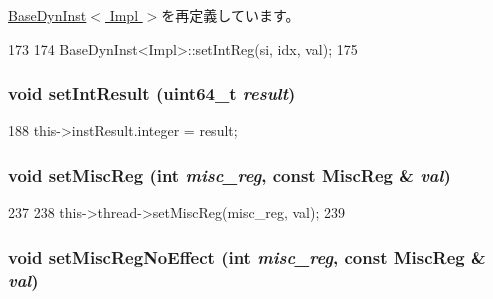 \hyperlink{classBaseDynInst_a654e99f2be7cd298378462ce9651bb44}{BaseDynInst$<$ Impl $>$}を再定義しています。


\begin{DoxyCode}
173     {
174         BaseDynInst<Impl>::setIntReg(si, idx, val);
175     }
\end{DoxyCode}
\hypertarget{classOzoneDynInst_aae8906a08187794ab88e5e140bb4c1e9}{
\subsubsection[{setIntResult}]{\setlength{\rightskip}{0pt plus 5cm}void setIntResult (uint64\_\-t {\em result})}}
\label{classOzoneDynInst_aae8906a08187794ab88e5e140bb4c1e9}



\begin{DoxyCode}
188 { this->instResult.integer = result; }
\end{DoxyCode}
\hypertarget{classOzoneDynInst_a1877dde4f3eb17a8b7d33ea40176c148}{
\subsubsection[{setMiscReg}]{\setlength{\rightskip}{0pt plus 5cm}void setMiscReg (int {\em misc\_\-reg}, \/  const {\bf MiscReg} \& {\em val})}}
\label{classOzoneDynInst_a1877dde4f3eb17a8b7d33ea40176c148}



\begin{DoxyCode}
237 {
238     this->thread->setMiscReg(misc_reg, val);
239 }
\end{DoxyCode}
\hypertarget{classOzoneDynInst_a763517aaea2f3decbc1ef9d064216b6f}{
\subsubsection[{setMiscRegNoEffect}]{\setlength{\rightskip}{0pt plus 5cm}void setMiscRegNoEffect (int {\em misc\_\-reg}, \/  const {\bf MiscReg} \& {\em val})}}
\label{classOzoneDynInst_a763517aaea2f3decbc1ef9d064216b6f}



